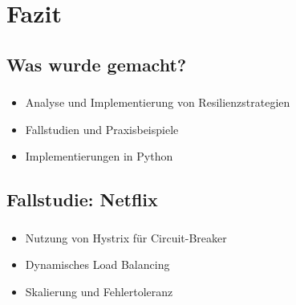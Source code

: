 \section{Fazit}
\subsection{Was wurde gemacht?}

\begin{frame}
    \frametitle{\insertsection}
    \framesubtitle{\insertsubsection}

    \begin{itemize}
        \item Analyse und Implementierung von Resilienzstrategien
        \item Fallstudien und Praxisbeispiele
        \item Implementierungen in Python
    \end{itemize}
\end{frame}

\subsection{Fallstudie: Netflix}
\begin{frame}
    \frametitle{\insertsection}
    \framesubtitle{\insertsubsection}

    \begin{itemize}
        \item Nutzung von Hystrix für Circuit-Breaker
        \item Dynamisches Load Balancing
        \item Skalierung und Fehlertoleranz
    \end{itemize}
\end{frame}

%
%

